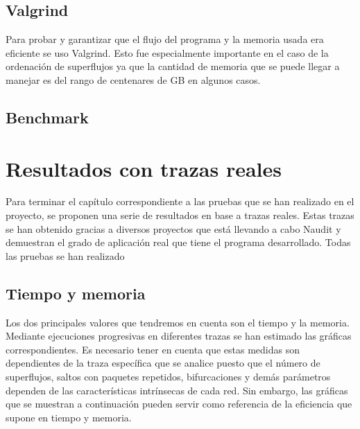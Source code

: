 \documentclass[twoside, 12pt]{epstfg}
\begin{document}
\subsection{Valgrind}
Para probar y garantizar que el flujo del programa y la memoria usada era eficiente se uso Valgrind. Esto fue especialmente importante en el caso de la ordenación de superflujos ya que la cantidad de memoria que se puede llegar a manejar es del rango de centenares de GB en algunos casos. 

\subsection{Benchmark}

\section{Resultados con trazas reales}
Para terminar el capítulo correspondiente a las pruebas que se han realizado en el proyecto, se proponen una serie de resultados en base a trazas reales. Estas trazas se han obtenido gracias a diversos proyectos que está llevando a cabo Naudit y demuestran el grado de aplicación real que tiene el programa desarrollado. Todas las pruebas se han realizado

\subsection{Tiempo y memoria}
Los dos principales valores que tendremos en cuenta son el tiempo y la memoria. Mediante ejecuciones progresivas en diferentes trazas se han estimado las gráficas correspondientes. Es necesario tener en cuenta que estas medidas son dependientes de la traza específica que se analice puesto que el número de superflujos, saltos con paquetes repetidos, bifurcaciones y demás parámetros dependen de las características intrínsecas de cada red. Sin embargo, las gráficas que se muestran a continuación pueden servir como referencia de la eficiencia que supone en tiempo y memoria.
\end{document}
